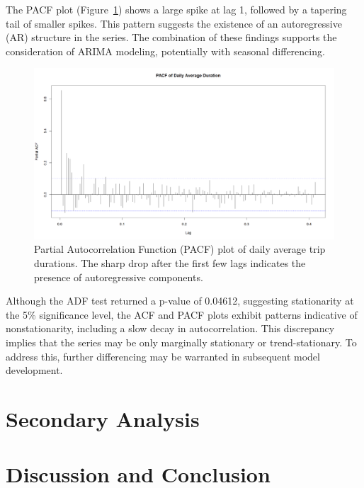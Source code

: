 \documentclass{article}
\begin{document}
The PACF plot (Figure~\ref{fig:pacf_plot}) shows a large spike at lag 1, followed by a tapering tail of smaller spikes. This pattern suggests the existence of an autoregressive (AR) structure in the series. The combination of these findings supports the consideration of ARIMA modeling, potentially with seasonal differencing.

\begin{figure}
  \centering
  \includegraphics[width=\textwidth]{finalproject/images/pacf-plot.png}
  \caption{Partial Autocorrelation Function (PACF) plot of daily average trip durations. The sharp drop after the first few lags indicates the presence of autoregressive components.}
  \label{fig:pacf_plot}
\end{figure}

Although the ADF test returned a p-value of 0.04612, suggesting stationarity at the 5\% significance level, the ACF and PACF plots exhibit patterns indicative of nonstationarity, including a slow decay in autocorrelation. This discrepancy implies that the series may be only marginally stationary or trend-stationary. To address this, further differencing may be warranted in subsequent model development.

\section {Secondary Analysis}
\section {Discussion and Conclusion}



\end{document}
